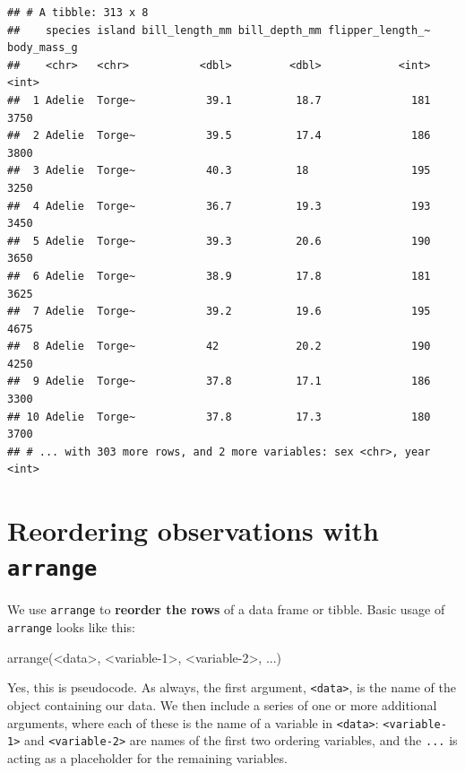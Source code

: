 \documentclass[
]{book}
\newenvironment{Shaded}{\begin{snugshade}}{\end{snugshade}}
\newcommand{\DecValTok}[1]{\textcolor[rgb]{0.00,0.00,0.81}{#1}}
\newcommand{\FunctionTok}[1]{\textcolor[rgb]{0.00,0.00,0.00}{#1}}
\newcommand{\NormalTok}[1]{#1}
\newcommand{\SpecialCharTok}[1]{\textcolor[rgb]{0.00,0.00,0.00}{#1}}
\begin{document}
\begin{verbatim}
## # A tibble: 313 x 8
##    species island bill_length_mm bill_depth_mm flipper_length_~ body_mass_g
##    <chr>   <chr>           <dbl>         <dbl>            <int>       <int>
##  1 Adelie  Torge~           39.1          18.7              181        3750
##  2 Adelie  Torge~           39.5          17.4              186        3800
##  3 Adelie  Torge~           40.3          18                195        3250
##  4 Adelie  Torge~           36.7          19.3              193        3450
##  5 Adelie  Torge~           39.3          20.6              190        3650
##  6 Adelie  Torge~           38.9          17.8              181        3625
##  7 Adelie  Torge~           39.2          19.6              195        4675
##  8 Adelie  Torge~           42            20.2              190        4250
##  9 Adelie  Torge~           37.8          17.1              186        3300
## 10 Adelie  Torge~           37.8          17.3              180        3700
## # ... with 303 more rows, and 2 more variables: sex <chr>, year <int>
\end{verbatim}

\hypertarget{reordering-observations-with-arrange}{%
\section{\texorpdfstring{Reordering observations with \texttt{arrange}}{Reordering observations with arrange}}\label{reordering-observations-with-arrange}}

We use \texttt{arrange} to \textbf{reorder the rows} of a data frame or tibble. Basic usage of \texttt{arrange} looks like this:

\begin{Shaded}
\begin{Highlighting}[]
\FunctionTok{arrange}\NormalTok{(}\SpecialCharTok{\textless{}}\NormalTok{data}\SpecialCharTok{\textgreater{}}\NormalTok{, }\SpecialCharTok{\textless{}}\NormalTok{variable}\DecValTok{{-}1}\SpecialCharTok{\textgreater{}}\NormalTok{, }\SpecialCharTok{\textless{}}\NormalTok{variable}\DecValTok{{-}2}\SpecialCharTok{\textgreater{}}\NormalTok{, ...)}
\end{Highlighting}
\end{Shaded}

Yes, this is pseudocode. As always, the first argument, \texttt{\textless{}data\textgreater{}}, is the name of the object containing our data. We then include a series of one or more additional arguments, where each of these is the name of a variable in \texttt{\textless{}data\textgreater{}}: \texttt{\textless{}variable-1\textgreater{}} and \texttt{\textless{}variable-2\textgreater{}} are names of the first two ordering variables, and the \texttt{...} is acting as a placeholder for the remaining variables.
\end{document}
